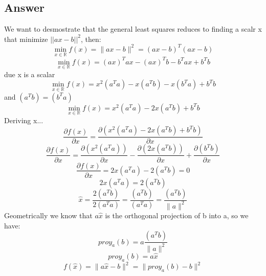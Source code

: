 \documentclass[conference, onecolumn]{IEEEtran}
\begin{document}
	\subsection*{Answer}
	We want to desmostrate that the general least squares reduces to finding a scalr x that minimize $||ax-b||^2$, then:
	\begin{equation}
		\min_{x \in \mathbb{R}} f(x) = \|ax - b\|^2 = (ax - b)^T (ax - b)
	\end{equation}
	\begin{equation}
		\min_{x \in \mathbb{R}} f(x) = (ax)^T ax - (ax)^T b - b^T ax + b^T b
	\end{equation}
	due x is a scalar
	\begin{equation}
		\min_{x \in \mathbb{R}} f(x) = x^2 (a^T a) - x(a^T b) - x(b^T a) + b^T b
	\end{equation}
	and $(a^Tb) = (b^Ta)$
	\begin{equation}
		\min_{x \in \mathbb{R}} f(x) = x^2 (a^T a) - 2x(a^T b) + b^T b
	\end{equation}
	Deriving x...
	\begin{equation}
		\frac{\partial f(x)}{\partial x} = \frac{\partial (x^2 (a^T a) - 2x(a^T b) + b^T b)}{\partial x}
	\end{equation}
	\begin{equation}
		\frac{\partial f(x)}{\partial x} = \frac{\partial (x^2 (a^T a))}{\partial x} - \frac{\partial (2x(a^T b))}{\partial x} + \frac{\partial (b^T b)}{\partial x}
	\end{equation}
	\begin{equation}
		\frac{\partial f(x)}{\partial x} = 2x(a^T a) - 2(a^T b) = 0
	\end{equation}
	\begin{equation}
		2x(a^T a) = 2(a^T b)
	\end{equation}
	\begin{equation}
		\hat{x} = \frac{2(a^T b)}{2(a^T a)} = \frac{(a^T b)}{(a^T a)} = \frac{(a^T b)}{\|a\|^2}
	\end{equation}
	Geometrically we know that $a\hat{x}$ is the orthogonal projection of b into a, so we have:
	\begin{equation}
		proy_a(b) = a \frac{(a^T b)}{\|a\|^2}
	\end{equation}
	\begin{equation}
		proy_a(b) = a \hat{x}
	\end{equation}
	\begin{equation}
		f(\hat{x}) = \|a\hat{x} - b\|^2 = \|proy_a(b) - b\|^2
	\end{equation}
\end{document}
